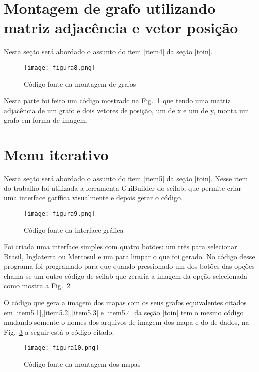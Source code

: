 \newpage
\section{Montagem de grafo utilizando matriz adjacência e vetor posição} \label{grafo}
Nesta seção será abordado o assunto do item \ref{item4} da seção \ref{toin}. 

\begin{figure}[!htb]
\centering
\texttt{[image: figura8.png]}
%
\caption{Código-fonte da montagem de grafos}
\label{fig8}
\end{figure}

Nesta parte foi feito um código  mostrado na  Fig.~\ref{fig8} que tendo uma matriz adjacência de um grafo e dois vetores de posição, um de x e um de y, monta um grafo em forma de imagem.

\section{Menu iterativo} \label{menu}
Nesta seção será abordado o assunto do item \ref{item5} da seção \ref{toin}. Nesse item do trabalho foi utilizada a ferramenta GuiBuilder do scilab, que permite criar uma interface garffica visualmente e depois gerar o código.

\begin{figure}[!htb]
\centering
\texttt{[image: figura9.png]}
%
\caption{Código-fonte da interface gráfica}
\label{fig9}
\end{figure}

\newpage
Foi criada uma interface simples com quatro botões: um três para selecionar Brasil, Inglaterra ou Mercosul e um para limpar o que foi gerado. No código desse programa foi programado para que quando pressionado um dos botões das opções chama-se um outro código de scilab que geraria a imagem da opção selecionada como mostra a Fig.~\ref{fig9}

O código que gera a imagem dos mapas com os seus grafos equivalentes citados em \ref{item5.1},\ref{item5.2},\ref{item5.3} e \ref{item5.4} da seção \ref{toin} tem o mesmo código mudando somente o nomes dos arquivos de imagem dos mapa e do de dados, na Fig.~\ref{fig10} a seguir está o código citado.


\begin{figure}[!htb]
\centering
\texttt{[image: figura10.png]}
%
\caption{Código-fonte da montagem dos mapas}
\label{fig10}
\end{figure}

